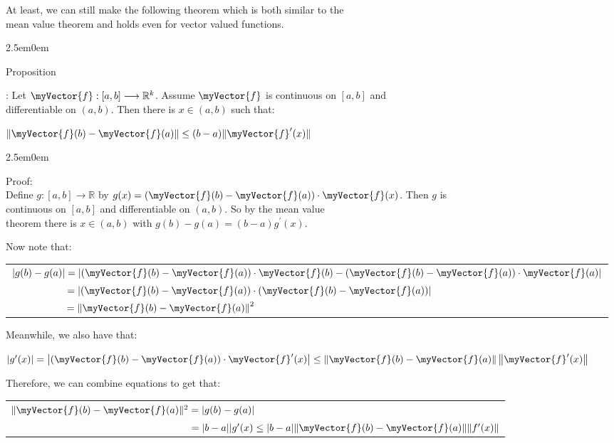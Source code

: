 \documentclass{book}
\newcommand{\hTwo}{%
   \color{MidnightBlue}%
   \fontsize{13}{15}\selectfont%
}
\newcommand{\hThree}{%
   \color{PineGreen!85!Orange}
   \fontsize{13}{15}\selectfont%
}
\newenvironment{myIndent}{%
   \begin{adjustwidth}{2.5em}{0em}%
}{%
   \end{adjustwidth}%
}
\newcounter{PropNumber}
\newcommand{\propCount}[1][1]{%
   \addtocounter{PropNumber}{#1}%
   \thePropNumber%
}
\newcommand{\retTwo}{\hfill\bigbreak}
\newcommand{\mVec}[1]{\myVector{#1}}
\begin{document}
At least, we can still make the following theorem which is both similar to the\\ mean value theorem and holds even for vector valued functions.
{\begin{myIndent}\hTwo
   Proposition \propCount: Let $\mVec{f}: [a, b] \longrightarrow \mathbb{R}^k$. Assume $\mVec{f}$ is continuous on $[a, b]$ and\\ differentiable on $(a, b)$. Then there is $x \in (a, b)$ such that:

   {\centering $\|\mVec{f}(b) - \mVec{f}(a)\| \leq (b-a)\|\mVec{f}^\prime(x)\|$\retTwo\par}

   {\begin{myIndent}\hThree
      Proof:\\
      Define $g: [a, b] \longrightarrow \mathbb{R}$ by $g(x) = (\mVec{f}(b) - \mVec{f}(a)) \cdot \mVec{f}(x)$. Then $g$ is\\ continuous on $[a, b]$ and differentiable on $(a, b)$. So by the mean value\\ theorem there is $x \in (a, b)$ with $g(b) - g(a) = (b-a)g^\prime(x)$.\retTwo

      Now note that:\\
      \begin{tabular}{l}
         $\left|g(b) - g(a)\right| = \left|\left(\mVec{f}(b) - \mVec{f}(a)\right)\cdot\mVec{f}(b) - \left(\mVec{f}(b) - \mVec{f}(a)\right)\cdot\mVec{f}(a)\right|$\\ [10pt]
         $\phantom{\left|g(b) - g(a)\right|} = \left|\left(\mVec{f}(b) - \mVec{f}(a)\right)\cdot\left(\mVec{f}(b) - \mVec{f}(a)\right)\right|$\\ [8pt]
         $\phantom{\left|g(b) - g(a)\right|} = \left\|\mVec{f}(b) - \mVec{f}(a)\right\|^2$
      \end{tabular}\retTwo

      Meanwhile, we also have that:
      
      {\centering $|g^\prime(x)| = \left|\left(\mVec{f}(b) - \mVec{f}(a)\right)\cdot\mVec{f}^\prime(x)\right| \leq \left\|\mVec{f}(b) - \mVec{f}(a)\right\|\left\|\mVec{f}^\prime(x)\right\| $ \retTwo\par}

      Therefore, we can combine equations to get that:

      {\centering 
      \begin{tabular}{l}
         $\|\mVec{f}(b) - \mVec{f}(a)\|^2 = |g(b) - g(a)|$\\
         $\phantom{\|\mVec{f}(b) - \mVec{f}(a)\|^2} = |b-a||g^\prime(x) \leq |b-a|\|\mVec{f}(b) - \mVec{f}(a)\|\|f^\prime(x)\|$
      \end{tabular}\retTwo\par}


\end{myIndent}}
\end{myIndent}}
\end{document}

